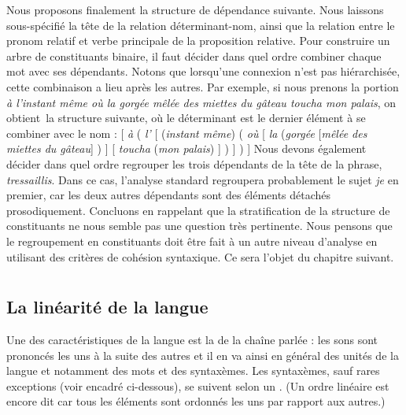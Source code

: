 {    Nous proposons finalement la structure de dépendance suivante. Nous laissons sous-spécifié la tête de la relation déterminant-nom, ainsi que la relation entre le pronom relatif et verbe principale de la proposition relative.
    \ea
    \z
    Pour construire un arbre de constituants binaire, il faut décider dans quel ordre combiner chaque mot avec ses dépendants. Notons que lorsqu’une connexion n’est pas hiérarchisée, cette combinaison a lieu après les autres. Par exemple, si nous prenons la portion \textit{à l’instant même où la gorgée mêlée des miettes du gâteau toucha mon palais}, on obtient~la structure suivante, où le déterminant est le dernier élément à se combiner avec le nom :
    \ea{}
        [ \textit{à} ( \textit{l’} [ (\textit{instant même}) ( \textit{où} [ \textit{la} (\textit{gorgée} [\textit{mêlée des miettes du gâteau}] ) ] [ \textit{toucha} (\textit{mon palais}) ] ) ] ) ]
    \z
    Nous devons également décider dans quel ordre regrouper les trois dépendants de la tête de la phrase, \textit{tressaillis}. Dans ce cas, l’analyse standard regroupera probablement le sujet \textit{je} en premier, car les deux autres dépendants sont des éléments détachés prosodiquement. Concluons en rappelant que la stratification de la structure de constituants ne nous semble pas une question très pertinente. Nous pensons que le regroupement en constituants doit être fait à un autre niveau d’analyse en utilisant des critères de cohésion syntaxique. Ce sera l’objet du chapitre suivant.
}
\chapter{}\label{sec:3.5}

\section{La linéarité de la langue}\label{sec:3.5.0}

Une des caractéristiques de la langue est la  de la chaîne parlée : les sons sont prononcés les uns à la suite des autres et il en va ainsi en général des unités de la langue et notamment des mots et des syntaxèmes. Les syntaxèmes, sauf rares exceptions (voir encadré ci-dessous), se suivent selon un . (Un ordre linéaire est encore dit  car tous les éléments sont ordonnés les uns par rapport aux autres.)

